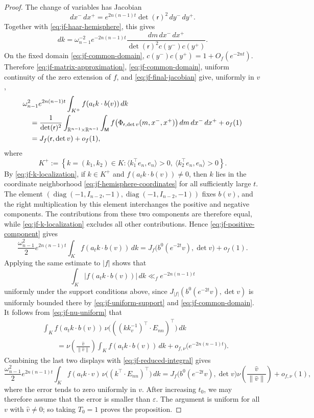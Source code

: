 \documentclass[reqno,11pt]{amsart}
\numberwithin{equation}{section}
\theoremstyle{definition}
\theoremstyle{remark}
\newcommand{\op}{\operatorname}
\newcommand{\diag}{\op{diag}}
\begin{document}
\begin{proof}
The change of variables has Jacobian
$$
dx^-\,dx^+
=e^{2n(n-1)t}\det(\mathsf r)^2\,dy^-\,dy^+.
$$
Together with \eqref{eq:jf-haar-hemisphere}, this gives
\begin{equation}\label{eq:jf-final-jacobian}
dk=\omega_{n-1}^{-2}e^{-2n(n-1)t}
\frac{dm\,dx^-\,dx^+}
{\det(\mathsf r)^2c(y^-)c(y^+)}.
\end{equation}
On the fixed domain \eqref{eq:jf-common-domain},
$c(y^-)c(y^+)=1+O_f(e^{-2nt})$. Therefore
\eqref{eq:jf-matrix-approximation},
\eqref{eq:jf-common-domain}, uniform continuity of the zero extension
of $f$, and \eqref{eq:jf-final-jacobian} give, uniformly in $v$,
\begin{align}
&\omega_{n-1}^2e^{2n(n-1)t}
\int_{K^+}f(a_tk\cdot b(v))\,dk \notag\\
&\quad=
\frac{1}{\det(\mathsf r)^2}
\int_{\mathbb R^{n-1}\times\mathbb R^{n-1}}
\int_{\mathsf M}
f\bigl(\Phi_{\mathsf r,\det v}(m,x^-,x^+)\bigr)
\,dm\,dx^-\,dx^++o_f(1)\notag\\
&\quad=J_f(\mathsf r,\det v)+o_f(1),
\label{eq:jf-positive-component}
\end{align}
where
$$
K^+:=\left\{k=(k_1,k_2)\in K:
\langle k_1^{\intercal}e_n,e_n\rangle>0,
\ \langle k_2^{\intercal}e_n,e_n\rangle>0
\right\}.
$$
By \eqref{eq:jf-k-localization}, if $k\in K^+$ and
$f(a_tk\cdot b(v))\ne0$, then $k$ lies in the coordinate neighborhood
\eqref{eq:jf-hemisphere-coordinates} for all sufficiently large $t$.
The element
$
\left(
\diag(-1,I_{n-2},-1),
\diag(-1,I_{n-2},-1)
\right)
$  fixes $b(v)$, and the right multiplication by this element
interchanges the positive and negative components.  
The contributions from these two components are therefore equal, while
\eqref{eq:jf-k-localization} excludes all other contributions. Hence
\eqref{eq:jf-positive-component} gives
$$
\frac{\omega_{n-1}^2}{2}e^{2n(n-1)t}
\int_K f(a_tk\cdot b(v))\,dk
=
J_f\bigl(b^0(e^{-2t}v),\det v\bigr)+o_f(1).
$$
Applying the same estimate to $|f|$ shows that
$$
\int_K |f(a_tk\cdot b(v))|\,dk
\ll_f e^{-2n(n-1)t}
$$
uniformly under the support conditions above, since
$J_{|f|}(b^0(e^{-2t}v),\det v)$ is uniformly bounded there by
\eqref{eq:jf-uniform-support} and \eqref{eq:jf-common-domain}.
It follows from \eqref{eq:jf-nu-uniform} that
\begin{align*}
&\int_K f(a_tk\cdot b(v))\,
\nu\bigl(((kk_v^{-1})^{\intercal}\cdot E_{nn})^{\intercal}\bigr)\,dk\\
&\qquad=
\nu\!\left(\frac{\widehat v}{\|\widehat v\|}\right)
\int_K f(a_tk\cdot b(v))\,dk
+o_{f,\nu}\bigl(e^{-2n(n-1)t}\bigr).
\end{align*}
Combining the last two displays with \eqref{eq:jf-reduced-integral}
gives
$$
\frac{\omega_{n-1}^2}{2}e^{2n(n-1)t}
\int_K f(a_tk\cdot v)\,
\nu\bigl((k^{\intercal}\cdot E_{nn})^{\intercal}\bigr)\,dk
=
J_f\bigl(b^0(e^{-2t}v),\det v\bigr)
\nu\!\left(\frac{\widehat v}{\|\widehat v\|}\right)
+o_{f,\nu}(1),
$$
where the error tends to zero uniformly in $v$. After increasing
$t_0$, we may therefore assume that the error is smaller than
$\varepsilon$. The argument is uniform for all $v$ with
$\widehat v\ne0$; so taking $T_0=1$ proves the proposition.
\end{proof}
\end{document}
